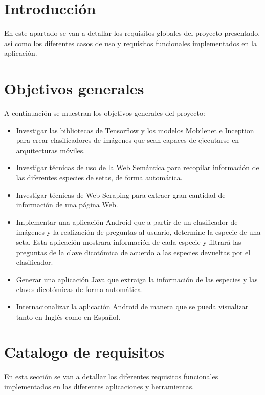 
\section{Introducción}

En este apartado se van a detallar los requisitos globales del proyecto presentado, así como los diferentes casos de uso y requisitos funcionales implementados en la aplicación.

\section{Objetivos generales}

A continuación se muestran los objetivos generales del proyecto:

\begin{itemize}
	\item Investigar las bibliotecas de Tensorflow y los modelos Mobilenet e Inception para crear clasificadores de imágenes que sean capaces de ejecutarse en arquitecturas móviles.
	\item Investigar técnicas de uso de la Web Semántica para recopilar información de las diferentes especies de setas, de forma automática.
	\item Investigar técnicas de Web Scraping para extraer gran cantidad de información de una página Web.
	\item Implementar una aplicación Android que a partir de un clasificador de imágenes y la realización de preguntas al usuario, determine la especie de una seta. Esta aplicación mostrara información de cada especie y filtrará las preguntas de la clave dicotómica de acuerdo a las especies devueltas por el clasificador.
	\item Generar una aplicación Java que extraiga la información de las especies y las claves dicotómicas de forma automática.
	\item Internacionalizar la aplicación Android de manera que se pueda visualizar tanto en Inglés como en Español.
\end{itemize}

\section{Catalogo de requisitos}

En esta sección se van a detallar los diferentes requisitos funcionales implementados en las diferentes aplicaciones y herramientas.

